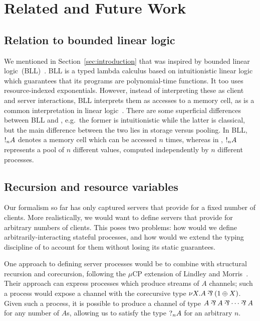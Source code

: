 \documentclass[a4paper,UKenglish]{lipics-v2016}
\begin{document}
\section{Related and Future Work}
\label{sec:conclusion}

\subsection*{Relation to bounded linear logic}
We mentioned in Section~\ref{sec:introduction} that \nodcap was inspired by
bounded linear logic~(BLL)~\cite{girard1992}. BLL is a typed lambda calculus
based on intuitionistic linear logic which guarantees that its programs are
polynomial-time functions.
It too uses resource-indexed exponentials. However, instead of interpreting
these as client and server interactions, BLL interprets them as accesses to a
memory cell, as is a common interpretation in linear logic~\cite{girard1987}.
There are some superficial differences between BLL and \nodcap, e.g.\ the former
is intuitionistic while the latter is classical, but the main difference between
the two lies in storage versus pooling. In BLL, $\take[n]{A}$ denotes a memory
cell which can be accessed $n$ times, whereas in \nodcap, $\take[n]{A}$
represents a pool of $n$ different values, computed independently by $n$
different processes.

\subsection*{Recursion and resource variables}
Our formalism so far has only captured servers that provide for a fixed number
of clients.  More realistically, we would want to define servers that provide
for arbitrary numbers of clients.  This poses two problems: how would we define
arbitrarily-interacting stateful processes, and how would we extend the
typing discipline of \nodcap to account for them without losing its static
guarantees.

One approach to defining server processes would be to combine \nodcap with
structural recursion and corecursion, following the $\mu\text{CP}$ extension of Lindley
and Morris~\cite{lindley2016}.  Their approach can express processes which
produce streams of $A$ channels; such a process would expose a channel with the
corecursive type $\nu X. A \parr (1 \plus X)$.  Given such a process, it is
possible to produce a channel of type $A \parr A \parr \cdots \parr A$ for any
number of $A$s, allowing us to satisfy the type $\give[n]{A}$ for an arbitrary
$n$.
\end{document}
